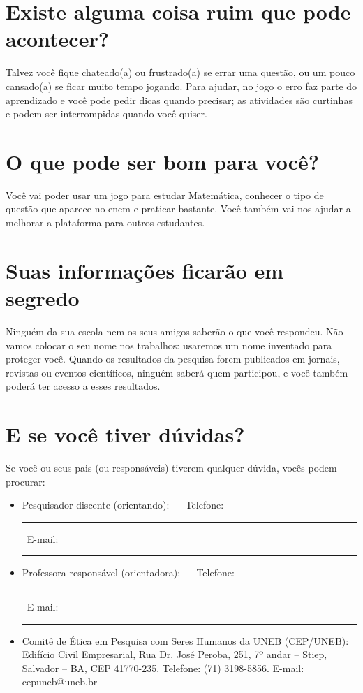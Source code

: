 \section{Existe alguma coisa ruim que pode acontecer?}
Talvez você fique chateado(a) ou frustrado(a) se errar uma questão, ou um pouco cansado(a) se ficar muito tempo jogando. Para ajudar, no jogo o erro faz parte do aprendizado e você pode pedir dicas quando precisar; as atividades são curtinhas e podem ser interrompidas quando você quiser.

\section{O que pode ser bom para você?}
Você vai poder usar um jogo para estudar Matemática, conhecer o tipo de questão que aparece no \gls{enem} e praticar bastante. Você também vai nos ajudar a melhorar a plataforma para outros estudantes.

\section{Suas informações ficarão em segredo}
Ninguém da sua escola nem os seus amigos saberão o que você respondeu. Não vamos colocar o seu nome nos trabalhos: usaremos um nome inventado para proteger você. Quando os resultados da pesquisa forem publicados em jornais, revistas ou eventos científicos, ninguém saberá quem participou, e você também poderá ter acesso a esses resultados.

\section{E se você tiver dúvidas?}
Se você ou seus pais (ou responsáveis) tiverem qualquer dúvida, vocês podem procurar:

\begin{itemize}
    \item Pesquisador discente (orientando): \imprimirautor\ -- Telefone: \rule{3cm}{0.4pt}\ E-mail: \rule{4cm}{0.4pt}
    \item Professora responsável (orientadora): \imprimirorientador\ -- Telefone: \rule{3cm}{0.4pt}\ E-mail: \rule{4cm}{0.4pt}
    \item Comitê de Ética em Pesquisa com Seres Humanos da UNEB (CEP/UNEB): Edifício Civil Empresarial, Rua Dr. José Peroba, 251, 7º andar -- Stiep, Salvador -- BA, CEP 41770-235. Telefone: (71) 3198-5856. E-mail: cepuneb@uneb.br
\end{itemize}

